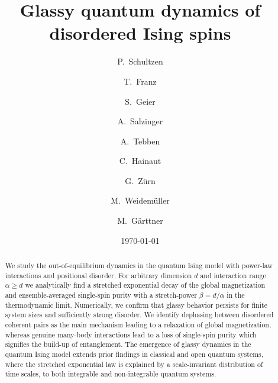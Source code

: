 \documentclass[aps,twocolumn,
superscriptaddress,
footinbib,
prl]{revtex4-1}
\begin{document}
\title{Glassy quantum dynamics of disordered Ising spins}

\date{\today}

\author{P.~Schultzen}
\author{T.~Franz}
\author{S.~Geier}
\author{A.~Salzinger}
\author{A.~Tebben}
\author{C.~Hainaut}
\author{G.~Z\"urn}
\author{M.~Weidemüller}
\author{M.~G\"{a}rttner}

\begin{abstract}
We study the out-of-equilibrium dynamics in the quantum Ising model with power-law interactions and positional disorder. For arbitrary dimension $d$ and interaction range $\alpha \geq d$ we analytically find a stretched exponential decay of the global magnetization and ensemble-averaged single-spin purity with a stretch-power $\beta = d/\alpha$  in the thermodynamic limit. Numerically, we confirm that glassy behavior persists for finite system sizes and sufficiently strong disorder. We identify dephasing between disordered coherent pairs as the main mechanism leading to a relaxation of global magnetization, whereas genuine many-body interactions lead to a loss of single-spin purity which signifies the build-up of entanglement.
The emergence of glassy dynamics in the quantum Ising model extends prior findings in classical and open quantum systems, where the stretched exponential law is explained by a scale-invariant distribution of time scales, to both integrable and non-integrable quantum systems.
\end{abstract}


\maketitle  
\end{document}
